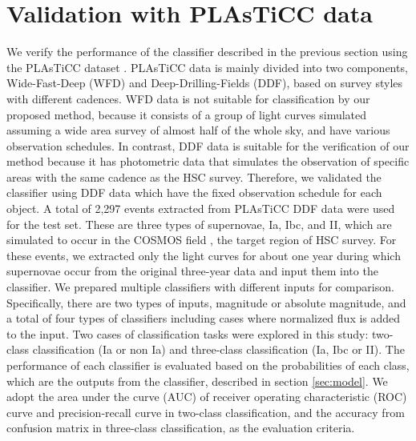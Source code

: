 \documentclass[useamsfonts]{pasj01}
\begin{document}
\section{Validation with PLAsTiCC data} %
%
We verify the performance of the classifier described in the previous section using the PLAsTiCC dataset \citep{plasticc_dataset}.
PLAsTiCC data is mainly divided into two components, Wide-Fast-Deep (WFD) and Deep-Drilling-Fields (DDF), based on survey styles with different cadences.
WFD data is not suitable for classification by our proposed method, because it consists of a group of light curves simulated assuming a wide area survey of almost half of the whole sky, and have various observation schedules.
In contrast, DDF data is suitable for the verification of our method because it has photometric data that simulates the observation of specific areas with the same cadence as the HSC survey.
Therefore, we validated the classifier using DDF data which have the fixed observation schedule for each object.
A total of 2,297 events extracted from PLAsTiCC DDF data were used for the test set.
These are three types of supernovae, Ia, Ibc, and II, which are simulated to occur in the COSMOS field \citep{scoville2007cosmos}, the target region of HSC survey.
For these events, we extracted only the light curves for about one year during which supernovae occur from the original three-year data and input them into the classifier.
%
We prepared multiple classifiers with different inputs for comparison.
Specifically, there are two types of inputs, magnitude or absolute magnitude, and a total of four types of classifiers including cases where normalized flux is added to the input. 
Two cases of classification tasks were explored in this study: two-class classification (Ia or non Ia) and three-class classification (Ia, Ibc or II).
The performance of each classifier is evaluated based on the probabilities of each class, which are the outputs from the classifier, described in section \ref{sec:model}.
We adopt the area under the curve (AUC) of receiver operating characteristic (ROC) curve and precision-recall curve in two-class classification, and the accuracy from confusion matrix in three-class classification, as the evaluation criteria.
%
\end{document}
